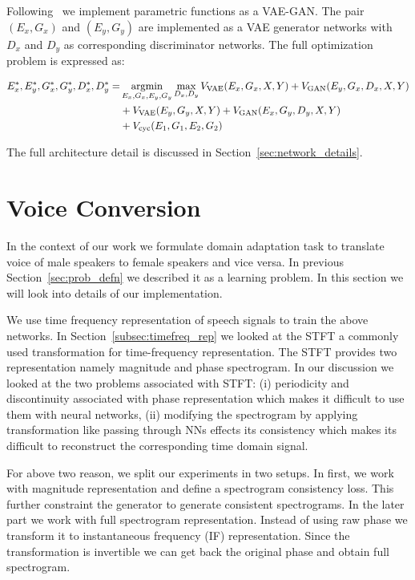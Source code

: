 Following~\cite{zhu2017unpaired} we implement parametric functions as a VAE-GAN. The pair $(E_x,G_x)$ and $(E_y, G_y)$ are implemented as a VAE generator networks with $D_x$ and $D_y$ as corresponding discriminator networks. The full optimization problem is expressed as:

\begin{equation}
    \begin{aligned}
        E_x^\ast, E_y^\ast, G_x^\ast, G_y^\ast, D_x^\ast, D_y^\ast =& \operatorname*{argmin}_{E_x,G_x,E_y,G_y} \max_{D_x, D_y} V_\text{VAE} (E_x,G_x,X,Y) +  V_\text{GAN} (E_y,G_x,D_x,X,Y) \\ 
        &+ V_\text{VAE} (E_y,G_y,X,Y) +  V_\text{GAN} (E_x,G_y,D_y,X,Y)\\
        &+  V_\text{cyc}(E_1,G_1,E_2,G_2)\\
    \end{aligned}
    \label{eq:loss_unit}
\end{equation}


The full architecture detail is discussed in Section~\ref{sec:network_details}.


\section{Voice Conversion}
\label{sec:voice_conv}
In the context of our work we formulate domain adaptation task to translate voice of male speakers to female speakers and vice versa. In previous Section~\ref{sec:prob_defn} we described it as a learning problem. In this section we will look into details of our implementation. 

We use time frequency representation of speech signals to train the above networks. In Section~\ref{subsec:timefreq_rep} we looked at the STFT a commonly used transformation for time-frequency representation. The STFT provides two representation namely magnitude and phase spectrogram. In our discussion we looked at the two problems associated with STFT: (i) periodicity and discontinuity associated with phase representation which makes it difficult to use them with neural networks, (ii) modifying the spectrogram by applying transformation like passing through NNs effects its consistency which makes its difficult to reconstruct the corresponding time domain signal.  

For above two reason, we split our experiments in two setups. In first, we work with magnitude representation and define a spectrogram consistency loss. This further constraint the generator to generate consistent spectrograms. In the later part we work with full spectrogram representation. Instead of using raw phase we transform it to instantaneous frequency (IF) representation. Since the transformation is invertible we can get back the original phase and obtain full spectrogram. 

